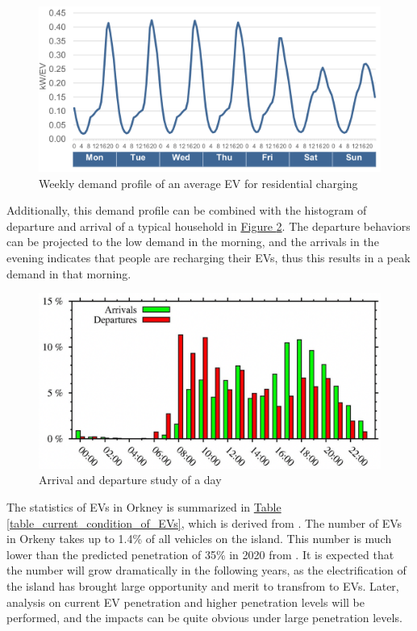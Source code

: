 \documentclass[12pt,a4paper]{report}
\begin{document}
        \begin{figure}[htbp]
            \centerline{\includegraphics[scale=1]{EVchargingdistribution}}
            \caption{Weekly demand profile of an average EV for residential charging}
            \label{fig_weekly_demand_profile}
        \end{figure}

        Additionally, this demand profile can be combined with the histogram of departure and arrival of a typical household in \hyperref[fig_arrival_vs_departure]{Figure \ref*{fig_arrival_vs_departure}}. The departure behaviors can be projected to the low demand in the morning, and the arrivals in the evening indicates that people are recharging their EVs, thus this results in a peak demand in that morning.

        \begin{figure}[htbp]
            \centerline{\includegraphics[scale=1.9]{evdepartures}}
            \caption{Arrival and departure study of a day}
            \label{fig_arrival_vs_departure}
        \end{figure}

        The statistics of EVs in Orkney is summarized in \hyperref[table_current_condition_of_EVs]{Table \ref*{table_current_condition_of_EVs}}, which is derived from \cite{report:OrkneyAudit}. The number of EVs in Orkeny takes up to 1.4\% of all vehicles on the island. This number is much lower than the predicted penetration of 35\% in 2020 from \cite{paper:PieltainFernandez2011}. It is expected that the number will grow dramatically in the following years, as the electrification of the island has brought large opportunity and merit to transfrom to EVs. Later, analysis on current EV penetration and higher penetration levels will be performed, and the impacts can be quite obvious under large penetration levels.
\end{document}
